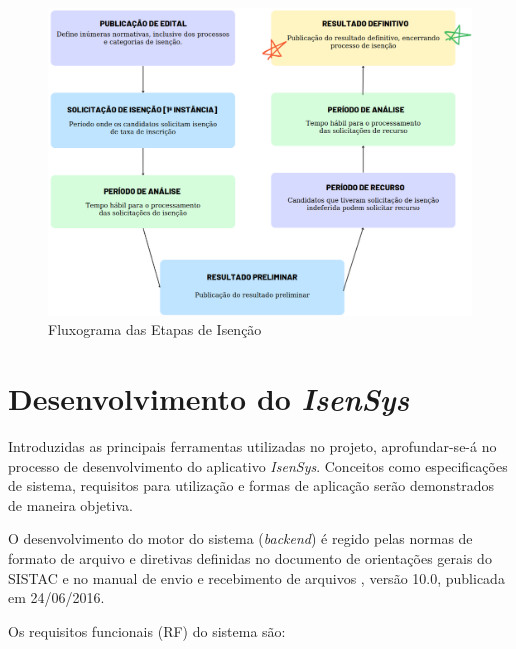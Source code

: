 \documentclass[
	12pt,			%
	openright,		%
	oneside,	
	a4paper,		%
	english,		%
	brazil			%
]{abntex2/abntex2}  %
\begin{document}
			\begin{figure}[ht]
				\begin{center}
					
					\caption{Fluxograma das Etapas de Isenção}
					
					\includegraphics[scale=0.37]{img/isencao-fluxograma}
					
				\end{center}
			\end{figure}

	\chapter{Desenvolvimento do \textit{IsenSys}}

		Introduzidas as principais ferramentas utilizadas no projeto, aprofundar-se-á no processo de desenvolvimento do aplicativo \textit{IsenSys}. Conceitos como especificações de sistema, requisitos para utilização e formas de aplicação serão demonstrados de maneira objetiva.
		
		O desenvolvimento do motor do sistema (\textit{backend}) é regido pelas normas de formato de arquivo e diretivas definidas no documento de orientações gerais do SISTAC \cite{sistac-gerais} e no manual de envio e recebimento de arquivos \cite{sistac-formatos}, versão 10.0, publicada em 24/06/2016.
		
		Os requisitos funcionais (RF) do sistema são:
	
\end{document}
